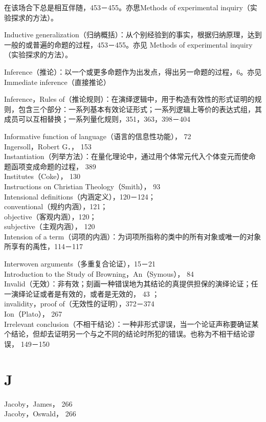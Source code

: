 在该场合下总是相互伴随，453－455。亦思Methods of experimental inquiry（实验探求的方法）。

Inductive generalization（归纳概括）：从个别经验到的事实，根据归纳原理，达到一般的或普遍的命题的过程，453－455。亦见 Methods of experimental inquiry（实验探求的方法）。

Inference（推论）：以一个或更多命题作为出发点，得出另一命题的过程，6。亦见 Immediate inference（直接推论）

Inference，Rules of（推论规则）：在演绎逻辑中，用于构造有效性的形式证明的规则，包含三个部分：一系列基本有效论证形式；一系列逻辑上等价的表达式组，其成员可以互相替换；一系列量化规则，351，363，398－404

Informative function of language（语言的信息性功能）， 72\\
Ingersoll，Robert G．， 153\\
Instantiation（列举方法）：在量化理论中，通过用个体常元代入个体变元而使命题函项变成命题的过程， 389\\
Institutes（Coke）， 130\\
Instructions on Christian Theology（Smith）， 93\\
Intensional definitions（内涵定义），120－124；\\
conventional（规约内涵），121；\\
objective（客观内涵），120；\\
subjective（主观内涵）， 120\\
Intension of a term（词项的内涵）：为词项所指称的类中的所有对象或唯一的对象所享有的禹性，114－117

Interwoven arguments（多重复合论证），15－21\\
Introduction to the Study of Browning，An（Symous）， 84\\
Invalid（无效）：非有效；刻画一种错误地为其结论的真提供担保的演绎论证；任一演绎论证或者是有效的，或者是无效的， 43 ；\\
invalidity，proof of（无效性的证明），372－374\\
Ion（Plato）， 267\\
Irrelevant conclusion（不相干结论）：一种非形式谬误，当一个论证声称要确证某个结论，但却去证明另一个与之不同的结论时所犯的错误。也称为不相干结论谬误， 149－150

\section*{J}
Jacoby，James， 266\\
Jacoby，Oswald， 266

